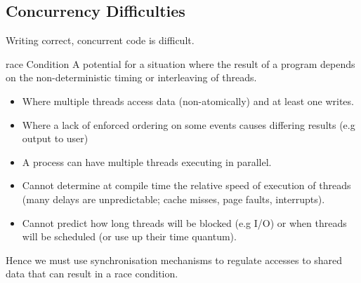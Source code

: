 \subsection{Concurrency Difficulties}
Writing correct, concurrent code is difficult.
\begin{definitionbox}{race Condition}
    A potential for a situation where the result of a program depends on the non-deterministic timing or interleaving of threads.
    \begin{itemize}
        \item Where multiple threads access data (non-atomically) and at least one writes.
        \item Where a lack of enforced ordering on some events causes differing results (e.g output to user)
    \end{itemize}
\end{definitionbox}
\begin{itemize}
    \item A process can have multiple threads executing in parallel.
    \item Cannot determine at compile time the relative speed of execution of threads (many delays are unpredictable; cache misses, page faults, interrupts).
    \item Cannot predict how long threads will be blocked (e.g I/O) or when threads will be scheduled (or use up their time quantum).
\end{itemize}
Hence we must use synchronisation mechanisms to regulate accesses to shared data that can result in a race condition.

